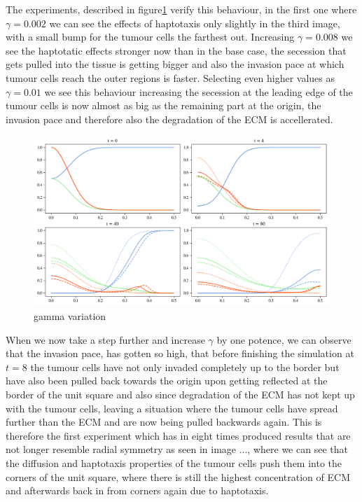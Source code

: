 The experiments, described in figure\ref{fig:gamma_variation} verify this behaviour, in the first one where $\gamma=0.002$ we can see the effects of haptotaxis only slightly in the third image, with a small bump for the tumour cells the farthest out. Increasing $\gamma=0.008$ we see the haptotatic effects stronger now than in the base case, the secession that gets pulled into the tissue is getting bigger and also the invasion pace at which tumour cells reach the outer regions is faster. Selecting even higher values as $\gamma = 0.01$ we see this behaviour increasing the secession at the leading edge of the tumour cells is now almost as big as the remaining part at the origin, the invasion pace and therefore also the degradation of the ECM is accellerated.
\begin{figure}[h]
    \centering
    \includegraphics[width=\textwidth]{resources/images/gamma_variation.png}
    \caption{gamma variation}
    \label{fig:gamma_variation}
\end{figure}
When we now take a step further and increase $\gamma$ by one potence, we can observe that the invasion pace, has gotten so high, that before finishing the simulation at $t=8$ the tumour cells have not only invaded completely up to the border but have also been pulled back towards the origin upon getting reflected at the border of the unit square and also since degradation of the ECM has not kept up with the tumour cells, leaving a situation where the tumour cells have spread further than the ECM and are now being pulled backwards again. This is therefore the first experiment which has in eight times produced results that are not longer resemble radial symmetry as seen in image ..., where we can see that the diffusion and haptotaxis properties of the tumour cells push them into the corners of the unit square, where there is still the highest concentration of ECM and afterwards back in from corners again due to haptotaxis.
